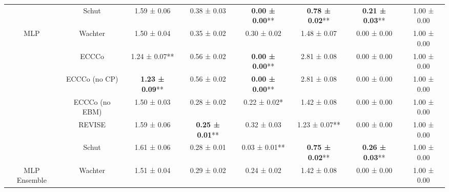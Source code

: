 \begin{table}
{\begin{tabular}[t]{cccccccc}
 & Schut & 1.59 ± 0.06\hphantom{*}\hphantom{*} & 0.38 ± 0.03\hphantom{*}\hphantom{*} & \textbf{0.00 ± 0.00}** & \textbf{0.78 ± 0.02}** & \textbf{0.21 ± 0.03}** & 1.00 ± 0.00\hphantom{*}\hphantom{*}\\

\multirow[t]{-6}{*}{\centering\arraybackslash MLP} & Wachter & 1.50 ± 0.04\hphantom{*}\hphantom{*} & 0.35 ± 0.02\hphantom{*}\hphantom{*} & 0.30 ± 0.02\hphantom{*}\hphantom{*} & 1.48 ± 0.07\hphantom{*}\hphantom{*} & 0.00 ± 0.00\hphantom{*}\hphantom{*} & 1.00 ± 0.00\hphantom{*}\hphantom{*}\\
\cmidrule{1-8}
 & ECCCo & 1.24 ± 0.07** & 0.56 ± 0.02\hphantom{*}\hphantom{*} & \textbf{0.00 ± 0.00}** & 2.81 ± 0.08\hphantom{*}\hphantom{*} & 0.00 ± 0.00\hphantom{*}\hphantom{*} & 1.00 ± 0.00\hphantom{*}\hphantom{*}\\

 & ECCCo (no CP) & \textbf{1.23 ± 0.09}** & 0.56 ± 0.02\hphantom{*}\hphantom{*} & \textbf{0.00 ± 0.00}** & 2.81 ± 0.08\hphantom{*}\hphantom{*} & 0.00 ± 0.00\hphantom{*}\hphantom{*} & 1.00 ± 0.00\hphantom{*}\hphantom{*}\\

 & ECCCo (no EBM) & 1.50 ± 0.03\hphantom{*}\hphantom{*} & 0.28 ± 0.02\hphantom{*}\hphantom{*} & 0.22 ± 0.02*\hphantom{*} & 1.42 ± 0.08\hphantom{*}\hphantom{*} & 0.00 ± 0.00\hphantom{*}\hphantom{*} & 1.00 ± 0.00\hphantom{*}\hphantom{*}\\

 & REVISE & 1.59 ± 0.06\hphantom{*}\hphantom{*} & \textbf{0.25 ± 0.01}** & 0.32 ± 0.03\hphantom{*}\hphantom{*} & 1.23 ± 0.07** & 0.00 ± 0.00\hphantom{*}\hphantom{*} & 1.00 ± 0.00\hphantom{*}\hphantom{*}\\

 & Schut & 1.61 ± 0.06\hphantom{*}\hphantom{*} & 0.28 ± 0.01\hphantom{*}\hphantom{*} & 0.03 ± 0.01** & \textbf{0.75 ± 0.02}** & \textbf{0.26 ± 0.03}** & 1.00 ± 0.00\hphantom{*}\hphantom{*}\\

\multirow[t]{-6}{*}{\centering\arraybackslash MLP Ensemble} & Wachter & 1.51 ± 0.04\hphantom{*}\hphantom{*} & 0.29 ± 0.02\hphantom{*}\hphantom{*} & 0.24 ± 0.02\hphantom{*}\hphantom{*} & 1.42 ± 0.08\hphantom{*}\hphantom{*} & 0.00 ± 0.00\hphantom{*}\hphantom{*} & 1.00 ± 0.00\hphantom{*}\hphantom{*}\\
\bottomrule
\end{tabular}}
\end{table}

